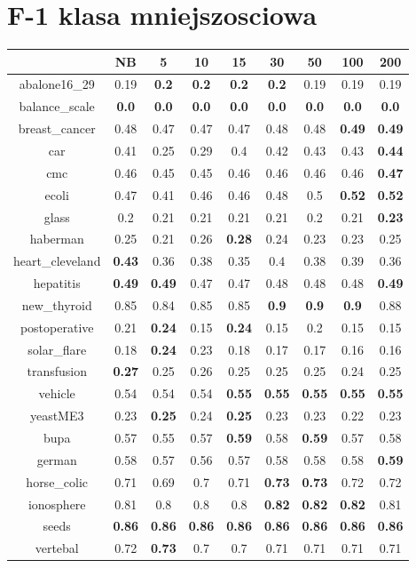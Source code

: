 \documentclass{article}%
\begin{document}
%
\section*{F{-}1 klasa mniejszosciowa}%
\begin{tabular}{c|cccccccc}%
\hline%
&NB&5&10&15&30&50&100&200\\%
\hline%
abalone16\_29&0.19&\textbf{0.2}&\textbf{0.2}&\textbf{0.2}&\textbf{0.2}&0.19&0.19&0.19\\%
\hline%
balance\_scale&\textbf{0.0}&\textbf{0.0}&\textbf{0.0}&\textbf{0.0}&\textbf{0.0}&\textbf{0.0}&\textbf{0.0}&\textbf{0.0}\\%
\hline%
breast\_cancer&0.48&0.47&0.47&0.47&0.48&0.48&\textbf{0.49}&\textbf{0.49}\\%
\hline%
car&0.41&0.25&0.29&0.4&0.42&0.43&0.43&\textbf{0.44}\\%
\hline%
cmc&0.46&0.45&0.45&0.46&0.46&0.46&0.46&\textbf{0.47}\\%
\hline%
ecoli&0.47&0.41&0.46&0.46&0.48&0.5&\textbf{0.52}&\textbf{0.52}\\%
\hline%
glass&0.2&0.21&0.21&0.21&0.21&0.2&0.21&\textbf{0.23}\\%
\hline%
haberman&0.25&0.21&0.26&\textbf{0.28}&0.24&0.23&0.23&0.25\\%
\hline%
heart\_cleveland&\textbf{0.43}&0.36&0.38&0.35&0.4&0.38&0.39&0.36\\%
\hline%
hepatitis&\textbf{0.49}&\textbf{0.49}&0.47&0.47&0.48&0.48&0.48&\textbf{0.49}\\%
\hline%
new\_thyroid&0.85&0.84&0.85&0.85&\textbf{0.9}&\textbf{0.9}&\textbf{0.9}&0.88\\%
\hline%
postoperative&0.21&\textbf{0.24}&0.15&\textbf{0.24}&0.15&0.2&0.15&0.15\\%
\hline%
solar\_flare&0.18&\textbf{0.24}&0.23&0.18&0.17&0.17&0.16&0.16\\%
\hline%
transfusion&\textbf{0.27}&0.25&0.26&0.25&0.25&0.25&0.24&0.25\\%
\hline%
vehicle&0.54&0.54&0.54&\textbf{0.55}&\textbf{0.55}&\textbf{0.55}&\textbf{0.55}&\textbf{0.55}\\%
\hline%
yeastME3&0.23&\textbf{0.25}&0.24&\textbf{0.25}&0.23&0.23&0.22&0.23\\%
\hline%
bupa&0.57&0.55&0.57&\textbf{0.59}&0.58&\textbf{0.59}&0.57&0.58\\%
\hline%
german&0.58&0.57&0.56&0.57&0.58&0.58&0.58&\textbf{0.59}\\%
\hline%
horse\_colic&0.71&0.69&0.7&0.71&\textbf{0.73}&\textbf{0.73}&0.72&0.72\\%
\hline%
ionosphere&0.81&0.8&0.8&0.8&\textbf{0.82}&\textbf{0.82}&\textbf{0.82}&0.81\\%
\hline%
seeds&\textbf{0.86}&\textbf{0.86}&\textbf{0.86}&\textbf{0.86}&\textbf{0.86}&\textbf{0.86}&\textbf{0.86}&\textbf{0.86}\\%
\hline%
vertebal&0.72&\textbf{0.73}&0.7&0.7&0.71&0.71&0.71&0.71\\%
\hline%
\end{tabular}
\end{document}
